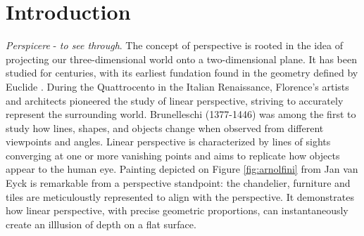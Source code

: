 \chapter{Introduction}
\label{chapter:introduction}

{}


\emph{Perspicere} - \textit{to see through}. The concept of perspective is rooted in the idea of projecting our three-dimensional world onto a two-dimensional plane. It has been studied for centuries, with its earliest fundation found in the geometry defined by Euclide \cite{euclide}. During the Quattrocento in the Italian Renaissance, Florence's artists and architects pioneered the study of linear perspective, striving to accurately represent the surrounding world. Brunelleschi (1377-1446) was among the first to study how lines, shapes, and objects change when observed from different viewpoints and angles. Linear perspective is characterized by lines of sights converging at one or more vanishing points and aims to replicate how objects appear to the human eye. Painting depicted on Figure \ref{fig:arnolfini} from Jan van Eyck is remarkable from a perspective standpoint: the chandelier, furniture and tiles are meticuloustly represented to align with the perspective. It demonstrates how linear perspective, with precise geometric proportions, can instantaneously create an illlusion of depth on a flat surface. 


